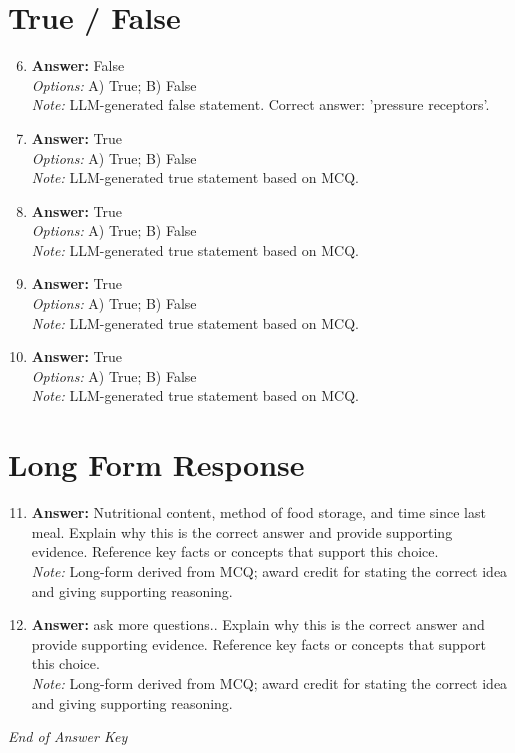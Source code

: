 \documentclass[12pt]{article}
\begin{document}
\section*{True / False}
\begin{enumerate}[label=\arabic*.]
\setcounter{enumi}{5}
\item \textbf{Answer:} False
\\ \textit{Options:} A) True; B) False
\\ \textit{Note:} LLM-generated false statement. Correct answer: 'pressure receptors'.
\item \textbf{Answer:} True
\\ \textit{Options:} A) True; B) False
\\ \textit{Note:} LLM-generated true statement based on MCQ.
\item \textbf{Answer:} True
\\ \textit{Options:} A) True; B) False
\\ \textit{Note:} LLM-generated true statement based on MCQ.
\item \textbf{Answer:} True
\\ \textit{Options:} A) True; B) False
\\ \textit{Note:} LLM-generated true statement based on MCQ.
\item \textbf{Answer:} True
\\ \textit{Options:} A) True; B) False
\\ \textit{Note:} LLM-generated true statement based on MCQ.
\end{enumerate}

\section*{Long Form Response}
\begin{enumerate}[label=\arabic*.]
\setcounter{enumi}{10}
\item \textbf{Answer:} Nutritional content, method of food storage, and time since last meal. Explain why this is the correct answer and provide supporting evidence. Reference key facts or concepts that support this choice.
\\ \textit{Note:} Long-form derived from MCQ; award credit for stating the correct idea and giving supporting reasoning.
\item \textbf{Answer:} ask more questions.. Explain why this is the correct answer and provide supporting evidence. Reference key facts or concepts that support this choice.
\\ \textit{Note:} Long-form derived from MCQ; award credit for stating the correct idea and giving supporting reasoning.
\end{enumerate}

\vfill
\noindent\textit{End of Answer Key}
\end{document}
